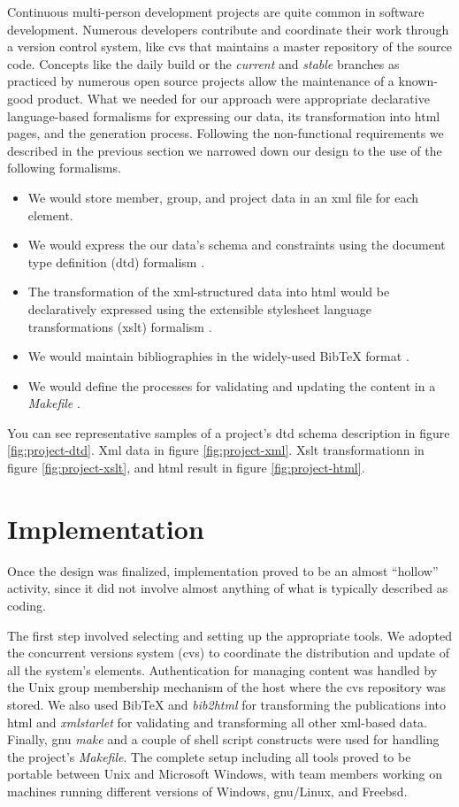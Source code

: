 \documentclass[10pt]{article}
\begin{document}
Continuous multi-person development projects are quite
common in software development.
Numerous developers contribute and coordinate their work
through a version control system, like {\sc cvs} that
maintains a master repository of the source code.
Concepts like the daily build \cite{CS95b} or the
{\em current} and {\em stable} branches as practiced by
numerous open source projects allow the maintenance
of a known-good product.
What we needed for our approach were appropriate
declarative language-based formalisms for expressing our data,
its transformation into {\sc html} pages, and the
generation process.
Following the non-functional requirements we described in the
previous section we narrowed down our design to the use of the
following formalisms.
\begin{itemize}
\item We would store member, group, and project data
in an {\sc xml} file for each element.
\item We would express the our data's schema and
constraints using the document type definition
({\sc dtd}) formalism \cite{HM01}.
\item The transformation of the {\sc xml}-structured data
into {\sc html} would be declaratively expressed using
the extensible stylesheet language transformations ({\sc xslt})
formalism \cite{HM01}.
\item We would maintain bibliographies in the
widely-used BibTeX format \cite{Lam94}.
\item We would define the processes for
validating and updating the content in a {\em Makefile} \cite{OTT91}.
\end{itemize}
You can see representative samples of a project's
{\sc dtd} schema description in figure \ref{fig:project-dtd}.
{\sc Xml} data in figure \ref{fig:project-xml}.
{\sc Xslt} transformationn in figure \ref{fig:project-xslt},
and {\sc html} result in figure \ref{fig:project-html}.

\section{Implementation}
Once the design was finalized,
implementation proved to be an almost ``hollow'' activity,
since it did not involve almost anything of what
is typically described as coding.

The first step involved selecting and setting up the
appropriate tools.
We adopted the concurrent versions system
({\sc cvs}) \cite{BF01} to coordinate the distribution
and update of all the system's elements.
Authentication for managing content was handled by the
Unix group membership mechanism of the host where the
{\sc cvs} repository was stored.
We also used
BibTeX and {\em bib2html} for transforming the publications
into {\sc html} and
{\em xmlstarlet} for validating and transforming
all other {\sc xml}-based data.
Finally, {\sc gnu} {\em make} and a couple of shell script
constructs were used for handling the project's {\em Makefile}.
The complete setup including all tools proved to be portable
between Unix and Microsoft Windows, with team members working
on machines running different versions of Windows, {\sc gnu}/Linux,
and Free{\sc bsd}.
\end{document}
